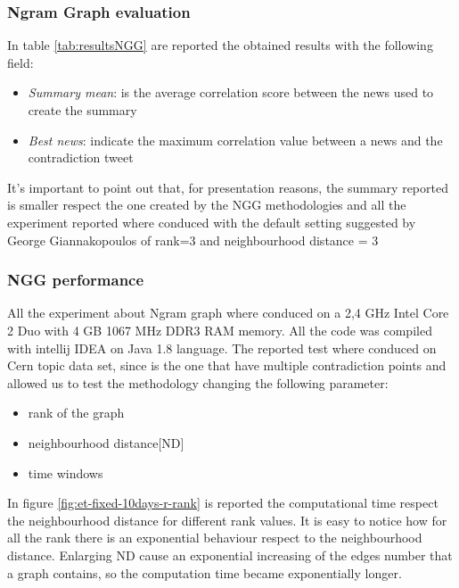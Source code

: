 \subsubsection*{Ngram Graph evaluation}
In table \ref{tab:resultsNGG} are reported the obtained results with the following field:
\begin{itemize}
	\item \emph{Summary mean}: is the average correlation score between the news used to create the summary
	\item \emph{Best news}: indicate the maximum correlation value between a news and the contradiction tweet
\end{itemize}
It's important to point out that, for presentation reasons, the summary reported is smaller respect the one created by the NGG methodologies and all the experiment reported where conduced with the default setting suggested by George Giannakopoulos of rank=3 and neighbourhood distance = 3










\subsubsection*{NGG performance}
All the experiment about Ngram graph where conduced on a 2,4 GHz Intel Core 2 Duo with 4 GB 1067 MHz DDR3 RAM memory.
 All the code was compiled with intellij IDEA on Java 1.8 language. 
The reported test where conduced on Cern topic data set, since is the one that have multiple contradiction points and allowed us to test the methodology changing the following parameter:
\begin{itemize}
	\item rank of the graph
	\item neighbourhood distance[ND]
	\item time windows
\end{itemize}


In figure \ref{fig:et-fixed-10days-r-rank} is reported the computational time respect the neighbourhood distance for different rank values. 
It is easy to notice how for all the rank there is an exponential behaviour respect to the neighbourhood distance. 
Enlarging ND cause an exponential increasing of the edges number that a graph contains, so the computation time became exponentially longer.

